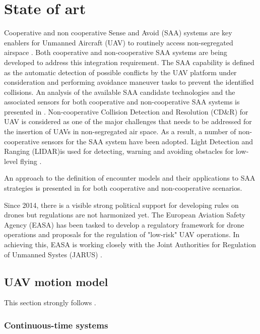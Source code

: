 \chapter{State of art}\label{03StateOfArt}
\noindent
Cooperative and non cooperative Sense and Avoid (SAA) systems are key enablers for Unmanned Aircraft (UAV) to routinely access non-segregated airspace \cite{spriesterbach2013unmanned}. Both cooperative and non-cooperative SAA systems are being developed to address this integration requirement.
\noindent
The SAA capability is defined as the automatic detection of possible conflicts by the UAV platform under consideration and performing avoidance maneuver tasks to prevent the identified collisions. An analysis of the available SAA candidate technologies and the associated sensors for both cooperative and non-cooperative SAA systems is presented in \cite{muraru2011critical}. Non-cooperative Collision Detection and Resolution (CD\&R) for UAV is considered as one of the major challenges that needs to be addressed \cite{lai2012see} for the insertion of UAVs in non-segregated air space. As a result, a number of non-cooperative sensors for the SAA system have been adopted. Light Detection and Ranging (LIDAR)is used for detecting, warning and avoiding obstacles for low-level flying \cite{sabatini2014lidar}.

An approach to the definition of encounter models and their applications to SAA strategies is presented in \cite{kochenderfer2008encounter} for both cooperative and non-cooperative scenarios.

Since 2014, there is a visible strong political support for developing rules on drones but regulations are not harmonized yet. The European Aviation Safety Agency (EASA) has been tasked to develop a regulatory framework for drone operations and proposals for the regulation of "low-risk" UAV operations. In achieving this, EASA is working closely with the Joint Authorities for Regulation of Unmanned Systes (JARUS) \cite{jarus2016regulations}.


\section{UAV motion model}
\noindent
This section strongly follows \cite{lee2011structure}.

\subsection{Continuous-time systems}\noindent

